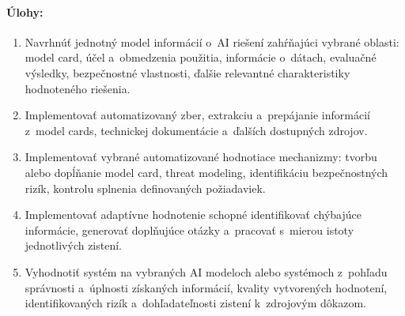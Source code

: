 \paragraph{Úlohy:}
\begin{enumerate}
    \item Navrhnúť jednotný model informácií o~AI riešení zahŕňajúci vybrané
    oblasti: model card, účel a~obmedzenia použitia, informácie o~dátach,
    evaluačné výsledky, bezpečnostné vlastnosti, ďalšie relevantné
    charakteristiky hodnoteného riešenia.
    \item Implementovať automatizovaný zber, extrakciu a~prepájanie informácií
    z~model cards, technickej dokumentácie a~ďalších dostupných zdrojov.
    \item Implementovať vybrané automatizované hodnotiace mechanizmy: tvorbu
    alebo dopĺňanie model card, threat modeling, identifikáciu bezpečnostných
    rizík, kontrolu splnenia definovaných požiadaviek.
    \item Implementovať adaptívne hodnotenie schopné identifikovať chýbajúce
    informácie, generovať doplňujúce otázky a~pracovať s~mierou istoty
    jednotlivých zistení.
    \item Vyhodnotiť systém na vybraných AI modeloch alebo systémoch z~pohľadu
    správnosti a~úplnosti získaných informácií, kvality vytvorených hodnotení,
    identifikovaných rizík a~dohľadateľnosti zistení k~zdrojovým dôkazom.
\end{enumerate}
